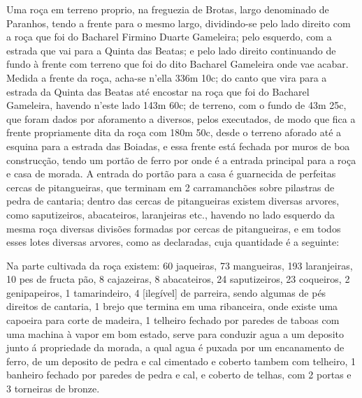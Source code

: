 \begin{citacao}
Uma roça em terreno proprio, na freguezia de Brotas, largo denominado de Paranhos, tendo a frente para o mesmo largo, dividindo-se pelo lado direito com a roça que foi do Bacharel Firmino Duarte Gameleira; pelo esquerdo, com a estrada que vai para a Quinta das Beatas; e pelo lado direito continuando de fundo à frente com terreno que foi do dito Bacharel Gameleira onde vae acabar. Medida a frente da roça, acha-se n'ella 336m 10c; do canto que vira para a estrada da Quinta das Beatas até encostar na roça que foi do Bacharel Gameleira, havendo n'este lado 143m 60c; de terreno, com o fundo de 43m 25c, que foram dados por aforamento a diversos, pelos executados, de modo que fica a frente propriamente dita da roça com 180m 50c, desde o terreno aforado até a esquina para a estrada das Boiadas, e essa frente está fechada por muros de boa construcção, tendo um portão de ferro por onde é a entrada principal para a roça e casa de morada. A entrada do portão para a casa é guarnecida de perfeitas cercas de pitangueiras, que terminam em 2 carramanchões sobre pilastras de pedra de cantaria; dentro das cercas de pitangueiras existem diversas arvores, como saputizeiros, abacateiros, laranjeiras etc., havendo no lado esquerdo da mesma roça diversas divisões formadas por cercas de pitangueiras, e em todos esses lotes diversas arvores, como as declaradas, cuja quantidade é a seguinte:

Na parte cultivada da roça existem: 60 jaqueiras, 73 mangueiras, 193 laranjeiras, 10 pes de fructa pão, 8 cajazeiras, 8 abacateiros, 24 saputizeiros, 23 coqueiros, 2 genipapeiros, 1 tamarindeiro, 4 [ilegível] de parreira, sendo algumas de pés direitos de cantaria, 1 brejo que termina em uma ribanceira, onde existe uma capoeira para corte de madeira, 1 telheiro fechado por paredes de taboas com uma machina à vapor em bom estado, serve para conduzir agua a um deposito junto á propriedade da morada, a qual agua é puxada por um encanamento de ferro, de um deposito de pedra e cal cimentado e coberto tambem com telheiro, 1 banheiro fechado por paredes de pedra e cal, e coberto de telhas, com 2 portas e 3 torneiras de bronze.


\end{citacao}
